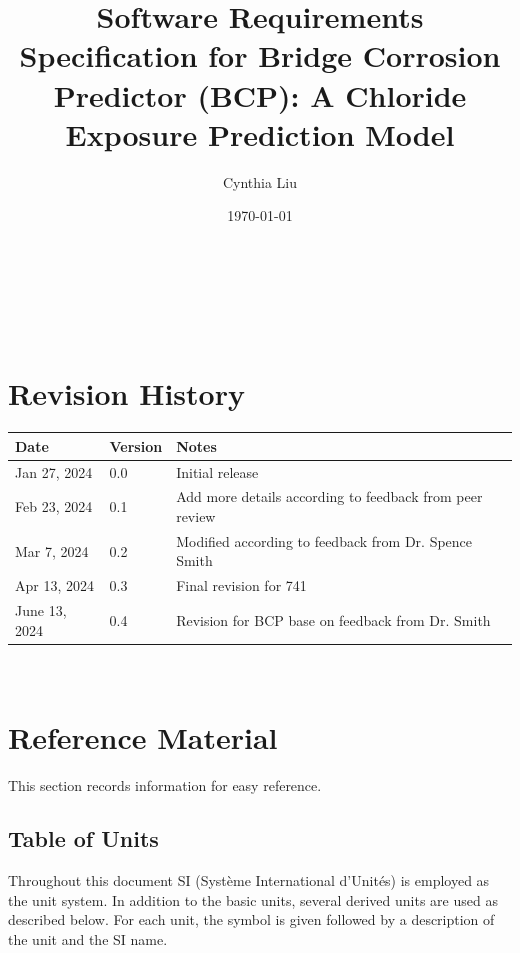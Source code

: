 \documentclass[12pt]{article}
\begin{document}
\title{Software Requirements Specification for Bridge Corrosion Predictor (BCP): A Chloride Exposure Prediction Model} 
\author{Cynthia Liu}
\date{\today}
	
\maketitle

~\newpage


\tableofcontents

~\newpage

\section*{Revision History}

\begin{tabularx}{\textwidth}{p{3cm}p{2cm}X}
\toprule {\bf Date} & {\bf Version} & {\bf Notes}\\
\midrule
Jan 27, 2024 & 0.0 & Initial release\\
Feb 23, 2024 & 0.1 & Add more details according to feedback from peer review\\
Mar 7, 2024 & 0.2 & Modified according to feedback from Dr. Spence Smith\\
Apr 13, 2024 & 0.3 & Final revision for 741\\
June 13, 2024 & 0.4 & Revision for BCP base on feedback from Dr. Smith\\
\bottomrule
\end{tabularx}

~\newpage

\section{Reference Material}

This section records information for easy reference.

\subsection{Table of Units}

Throughout this document SI (Syst\`{e}me International d'Unit\'{e}s) is employed
as the unit system.  In addition to the basic units, several derived units are
used as described below.  For each unit, the symbol is given followed by a
description of the unit and the SI name.
~\newline
\end{document}
